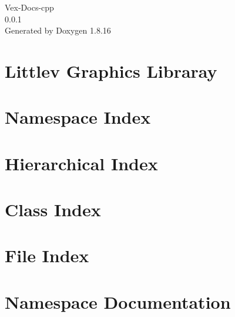 \let\mypdfximage\pdfximage\def\pdfximage{\immediate\mypdfximage}\documentclass[twoside]{book}
\newcommand{\+}{\discretionary{\mbox{\scriptsize$\hookleftarrow$}}{}{}}
\newcommand{\clearemptydoublepage}{%
  \newpage{\pagestyle{empty}\cleardoublepage}%
}
\begin{document}
\hypersetup{pageanchor=false,
             bookmarksnumbered=true,
             pdfencoding=unicode
            }
\begin{titlepage}
\vspace*{7cm}
\begin{center}%
{\Large Vex-\/\+Docs-\/cpp \\[1ex]\large 0.\+0.\+1 }\\
\vspace*{1cm}
{\large Generated by Doxygen 1.8.16}\\
\end{center}
\end{titlepage}
\clearemptydoublepage
{}
\tableofcontents
\clearemptydoublepage
{}
\hypersetup{pageanchor=true}

\chapter{Littlev Graphics Libraray}
\label{md__c_1__users_kidco__v_e_x-2019_include_display__r_e_a_d_m_e}

\chapter{Namespace Index}

\chapter{Hierarchical Index}

\chapter{Class Index}

\chapter{File Index}

\chapter{Namespace Documentation}

\end{document}
